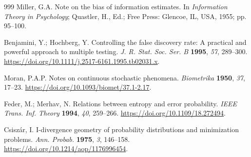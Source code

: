 \begin{thebibliography}{999}
Miller, G.A. Note on the bias of information estimates. In \emph{Information Theory in Psychology}; Quastler, H., Ed.; Free Press: Glencoe, IL, USA, 1955; pp. 95--100.

Benjamini, Y.; Hochberg, Y. Controlling the false discovery rate: A practical and powerful approach to multiple testing. \emph{J. R. Stat. Soc. Ser. B} \textbf{1995}, \emph{57}, 289--300. \url{https://doi.org/10.1111/j.2517-6161.1995.tb02031.x}.

Moran, P.A.P. Notes on continuous stochastic phenomena. \emph{Biometrika} \textbf{1950}, \emph{37}, 17--23. \url{https://doi.org/10.1093/biomet/37.1-2.17}.

Feder, M.; Merhav, N. Relations between entropy and error probability. \emph{IEEE Trans. Inf. Theory} \textbf{1994}, \emph{40}, 259--266. \url{https://doi.org/10.1109/18.272494}.

Csisz\'ar, I. I-divergence geometry of probability distributions and minimization problems. \emph{Ann. Probab.} \textbf{1975}, \emph{3}, 146--158. \url{https://doi.org/10.1214/aop/1176996454}.

\end{thebibliography}
